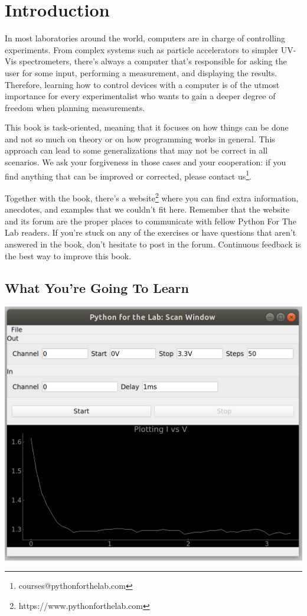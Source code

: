 \chapter{Introduction}\label{ch:introduction}
In most laboratories around the world, computers are in charge of controlling experiments. From complex systems such as particle accelerators to simpler UV-Vis spectrometers, there's always a computer that's responsible for asking the user for some input, performing a measurement, and displaying the results. Therefore, learning how to control devices with a computer is of the utmost importance for every experimentalist who wants to gain a deeper degree of freedom when planning measurements.

This book is task-oriented, meaning that it focuses on how things can be done and not so much on theory or on how programming works in general. This approach can lead to some generalizations that may not be correct in all scenarios. We ask your forgiveness in those cases and your cooperation: if you find anything that can be improved or corrected, please contact us\footnote{courses@pythonforthelab.com}.

Together with the book, there's a website\footnote{https://www.pythonforthelab.com} where you can find extra information, anecdotes, and examples that we couldn't fit here. Remember that the website and its forum are the proper places to communicate with fellow Python For The Lab readers. If you're stuck on any of the exercises or have questions that aren't answered in the book, don't hesitate to post in the forum. Continuous feedback is the best way to improve this book.

\section{What You're Going To Learn}\label{sec:what-are-you-going-to-learn}
\begin{center}
\includegraphics[width=.6\linewidth]{images/Chapter_01/screenshot.png}
\end{center}


